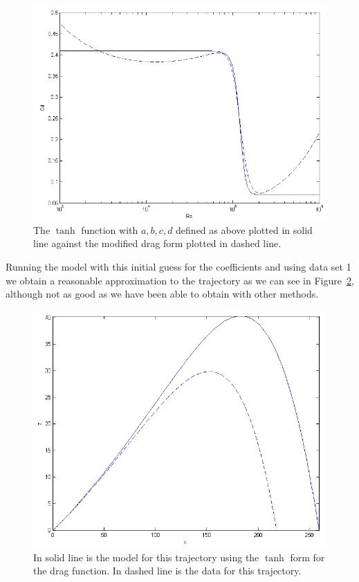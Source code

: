 \begin{figure}
\centering
\includegraphics[scale=0.7]{../images/tanh.png}
\caption[The tanh form near the drag crisis]{The $\tanh$ function with $a,b,c,d$ defined as above plotted
in solid line against the modified drag form plotted in dashed line.}
\label{tanh-init}
\end{figure}

Running the model with this initial guess for the coefficients and using data set 1 we obtain a reasonable
approximation to the trajectory as we can see in Figure~\ref{tanh-model}, although not as good as 
we have been able to obtain with other methods.
\begin{figure}
\centering
\includegraphics[scale=0.7]{../images/tanh_guess.png}
\caption[Running the initial form of the tanh drag form]{In solid line is the model for this trajectory
using the $\tanh$ form for the drag function. In dashed line is the data for this trajectory.}
\label{tanh-model}
\end{figure}

